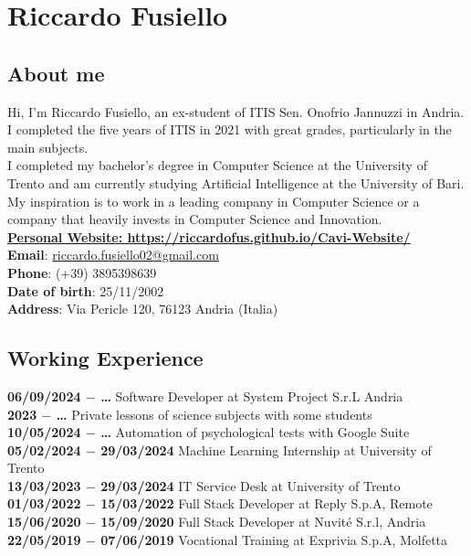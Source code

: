 \documentclass[12pt]{article}
\begin{document}
\section*{Riccardo Fusiello}\subsection*{About me}
Hi, I'm Riccardo Fusiello, an ex-student of ITIS Sen. Onofrio Jannuzzi in Andria. I completed the five years of ITIS in 2021 with great grades, particularly in the main subjects.\\
I completed my bachelor's degree in Computer Science at the University of Trento and am currently studying Artificial Intelligence at the University of Bari. My inspiration is to work in a leading company in Computer Science or a company that heavily invests in Computer Science and Innovation.\\
\href{https://riccardofus.github.io/Cavi-Website/}{\textbf{Personal Website: https://riccardofus.github.io/Cavi-Website/}}\\
\textbf{Email}: \href{mailto:riccardo.fusiello02@gmail.com}{riccardo.fusiello02@gmail.com}\\
\textbf{Phone}: (+39) 3895398639\\
\textbf{Date of birth}: 25/11/2002\\
\textbf{Address}: Via Pericle 120, 76123 Andria (Italia)
\subsection*{Working Experience}
\textbf{06/09/2024 $-$ \dots} Software Developer at System Project S.r.L Andria \\
\textbf{2023 $-$ \dots} Private lessons of science subjects with some students\\
\textbf{10/05/2024 $-$ \dots} Automation of psychological tests with Google Suite\\
\textbf{05/02/2024 $-$ 29/03/2024} Machine Learning Internship at University of Trento\\
\textbf{13/03/2023 $-$ 29/03/2024} IT Service Desk at University of Trento\\
\textbf{01/03/2022 $-$ 15/03/2022} Full Stack Developer at Reply S.p.A, Remote\\
\textbf{15/06/2020 $-$ 15/09/2020} Full Stack Developer at Nuvité S.r.l, Andria \\
\textbf{22/05/2019 $-$ 07/06/2019} Vocational Training at Exprivia S.p.A, Molfetta
\end{document}
